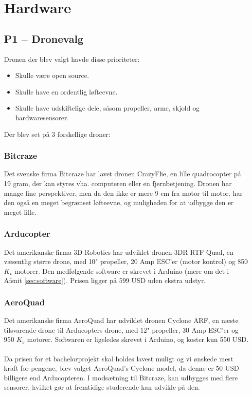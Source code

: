 \documentclass[Main]{subfiles}
\begin{document}
\chapter{Hardware}


\section[Dronevalg]{P1 -- Dronevalg}
Dronen der blev valgt havde disse prioriteter:
\begin{itemize}
\item Skulle være open source.
\item Skulle have en ordentlig løfteevne.
\item Skulle have udskiftelige dele, såsom propeller, arme, skjold og hardwaresensorer.
\end{itemize}

Der blev set på 3 forskellige droner:
\subsection{Bitcraze}
Det svenske firma Bitcraze har lavet dronen CrazyFlie\cite{BitCraze}, en lille quadrocopter på 19 gram, der kan styres vha. computeren eller en fjernbetjening.
Dronen har mange fine perspektiver, men da den ikke er mere 9 cm fra motor til motor, har den også en meget begrænset løfteevne, og muligheden for at udbygge den er meget lille.

\subsection{Arducopter}
Det amerikanske firma 3D Robotics har udviklet dronen 3DR RTF Quad\cite{ArduCopter}, en væsentlig større drone, med 10"\xspace propeller, 20 Amp ESC'er (motor kontrol) og 850 $K_v$\cite{Kv} motorer.
Den medfølgende software er skrevet i Arduino (mere om det i Afsnit \ref{sec:software}). 
Prisen ligger på 599 USD uden ekstra udstyr.

\subsection{AeroQuad}
Det amerikanske firma AeroQuad har udviklet dronen Cyclone ARF\cite{AQ-store}, en næste tilsvarende drone til Arducopters drone, med 12" propeller, 30 Amp ESC'er og 950 $K_v$\cite{Kv} motorer.
Softwaren er ligeledes skrevet i Arduino, og koster kun 550 USD.
\\
\\
Da prisen for et bachelorprojekt skal holdes lavest muligt og vi ønskede mest kraft for pengene, blev valget AeroQuad's Cyclone model, da denne er 50 USD billigere end Arducopteren. 
I modsætning til Bitcraze, kan udbygges med flere sensorer, hvilket gør at fremtidige studerende kan udvikle på den.
\end{document}
